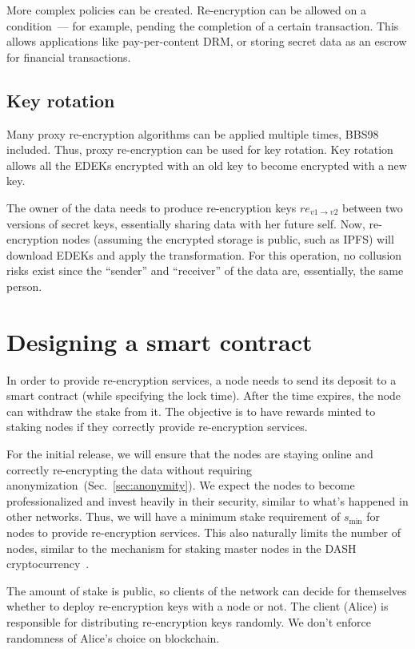 \documentclass[longbibliography,nofootinbib]{revtex4-1}
\begin{document}
\begin{CJK*}{UTF8}{gbsn}
More complex policies can be created.
Re-encryption can be allowed on a condition~--- for example, pending the completion of a certain transaction.
This allows applications like pay-per-content DRM, or storing secret data as an escrow for financial transactions.

\subsection{Key rotation}
\label{sec:key-rotation}

Many proxy re-encryption algorithms can be applied multiple times, BBS98~\cite{BBS98} included.
Thus, proxy re-encryption can be used for key rotation.
Key rotation allows all the EDEKs encrypted with an old key to become encrypted with a new key.

The owner of the data needs to produce re-encryption keys $re_{v1\rightarrow v2}$ between two versions of secret keys, essentially
sharing data with her future self.
Now, re-encryption nodes (assuming the encrypted storage is public, such as IPFS) will download EDEKs and apply the transformation.
For this operation, no collusion risks exist since the ``sender'' and ``receiver'' of the data are, essentially, the same person.

\section{Designing a smart contract}
\label{sec:smart-contract}
In order to provide re-encryption services, a node needs to send its deposit to a smart contract (while specifying the lock time).
After the time expires, the node can withdraw the stake from it.
The objective is to have rewards minted to staking nodes if they correctly provide re-encryption services.

For the initial release, we will ensure that the nodes are staying online and correctly re-encrypting the data without requiring
anonymization~(Sec.~\ref{sec:anonymity}).
We expect the nodes to become professionalized and invest heavily in their security, similar to what's happened in other networks.
Thus, we will have a minimum stake requirement of $s_{\min}$ for nodes to provide re-encryption services.
This also naturally limits the number of nodes, similar to the mechanism for staking master nodes in the DASH cryptocurrency~\cite{dash:whitepaper}.

The amount of stake is public, so clients of the network can decide for themselves whether to deploy re-encryption keys with a node or not.
The client (Alice) is responsible for distributing re-encryption keys randomly.
We don't enforce randomness of Alice's choice on blockchain.


\end{CJK*}
\end{document}
